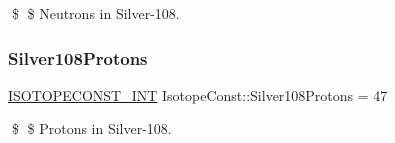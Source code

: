 \$ \$ Neutrons in Silver-\/108. \mbox{\label{group___isotope_const-_silver-_ag108_ga1419315e3654228e66b7990169c60b79}} 
\subsubsection{\texorpdfstring{Silver108\+Protons}{Silver108Protons}}
{\footnotesize\ttfamily \mbox{\hyperlink{group___isotope_const-_macros_ga5f18360b3e99483a35c32d789e62621c}{I\+S\+O\+T\+O\+P\+E\+C\+O\+N\+S\+T\+\_\+\+I\+NT}} Isotope\+Const\+::\+Silver108\+Protons = 47}

\$ \$ Protons in Silver-\/108. 